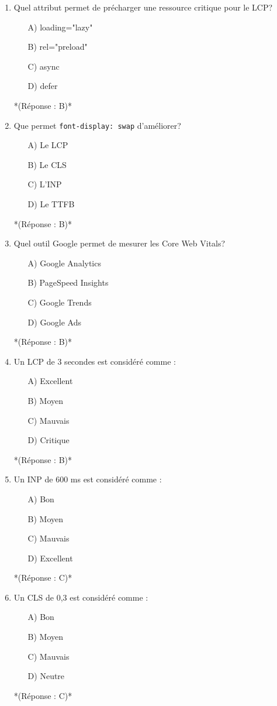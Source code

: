 \documentclass[12pt,a4paper,twoside]{report}
\begin{document}
\begin{enumerate}
\item Quel attribut permet de précharger une ressource critique pour le LCP?
\begin{itemize}
\item[A)] loading="lazy"
\item[B)] rel="preload"
\item[C)] async
\item[D)] defer
\end{itemize}
*(Réponse : B)*

\item Que permet \texttt{font-display: swap} d'améliorer?
\begin{itemize}
\item[A)] Le LCP
\item[B)] Le CLS
\item[C)] L'INP
\item[D)] Le TTFB
\end{itemize}
*(Réponse : B)*

\item Quel outil Google permet de mesurer les Core Web Vitals?
\begin{itemize}
\item[A)] Google Analytics
\item[B)] PageSpeed Insights
\item[C)] Google Trends
\item[D)] Google Ads
\end{itemize}
*(Réponse : B)*

\item Un LCP de 3 secondes est considéré comme :
\begin{itemize}
\item[A)] Excellent
\item[B)] Moyen
\item[C)] Mauvais
\item[D)] Critique
\end{itemize}
*(Réponse : B)*

\item Un INP de 600 ms est considéré comme :
\begin{itemize}
\item[A)] Bon
\item[B)] Moyen
\item[C)] Mauvais
\item[D)] Excellent
\end{itemize}
*(Réponse : C)*

\item Un CLS de 0,3 est considéré comme :
\begin{itemize}
\item[A)] Bon
\item[B)] Moyen
\item[C)] Mauvais
\item[D)] Neutre
\end{itemize}
*(Réponse : C)*


\end{enumerate}
\end{document}
